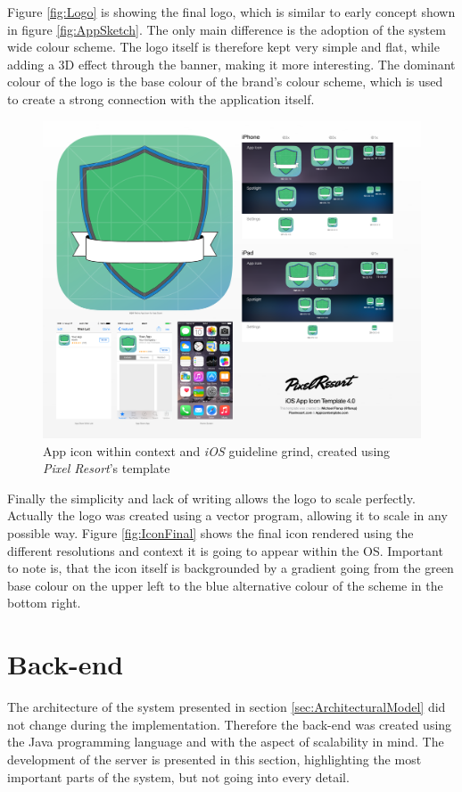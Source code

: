 Figure \vref{fig:Logo} is showing the final logo, which is similar to early concept shown in figure \vref{fig:AppSketch}. The only main difference is the adoption of the system wide colour scheme. The logo itself is therefore kept very simple and flat, while adding a 3D effect through the banner, making it more interesting. The dominant colour of the logo is the base colour of the brand's colour scheme, which is used to create a strong connection with the application itself.

\begin{figure}[h]
  	\centering
  	\includegraphics[width=0.6\linewidth]{./images/icon-context.png}
  	\caption{App icon within context and \emph{iOS} guideline grind, created using \emph{Pixel Resort}'s template}
	\label{fig:IconFinal}
\end{figure}

Finally the simplicity and lack of writing allows the logo to scale perfectly. Actually the logo was created using a vector program, allowing it to scale in any possible way. Figure \vref{fig:IconFinal} shows the final icon rendered using the different resolutions and context it is going to appear within the \gls{OS}. Important to note is, that the icon itself is backgrounded by a gradient going from the green base colour on the upper left to the blue alternative colour of the scheme in the bottom right.

\section{Back-end}
The architecture of the system presented in section \vref{sec:ArchitecturalModel} did not change during the implementation. Therefore the back-end was created using the Java programming language and with the aspect of scalability in mind. The development of the server is presented in this section, highlighting the most important parts of the system, but not going into every detail.

